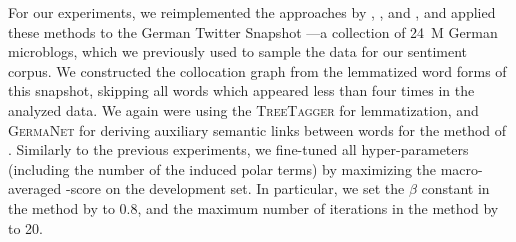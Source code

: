 For our experiments, we reimplemented the approaches by
\citet{Takamura:05}, \citet{Velikovich:10}, \citet{Kiritchenko:14} and
\citet{Severyn:15}, and applied these methods to the German Twitter
Snapshot \cite{Scheffler:14}---a collection of 24~M German microblogs,
which we previously used to sample the data for our sentiment corpus.
We constructed the collocation graph from the lemmatized word forms of
this snapshot, skipping all words which appeared less than four times
in the analyzed data.  We again were using the \textsc{TreeTagger}
\cite{Schmid:95} for lemmatization, and \textsc{GermaNet} for deriving
auxiliary semantic links between words for the method of
\citet{Takamura:05}.  Similarly to the previous experiments, we
fine-tuned all hyper-parameters (including the number of the induced
polar terms) by maximizing the macro-averaged \F{}-score on the
development set.  In particular, we set the $\beta$ constant in the
method by \citet{Takamura:05} to 0.8, and the maximum number of
iterations in the method by \citet{Velikovich:10} to 20.



